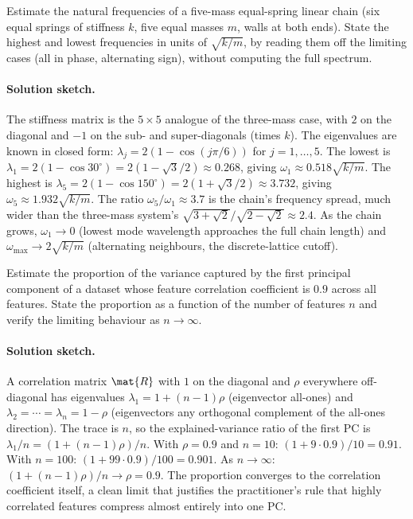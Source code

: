 \begin{exercise}
Estimate the natural frequencies of a five-mass equal-spring
linear chain (six equal springs of stiffness $k$, five equal masses
$m$, walls at both ends). State the highest and lowest frequencies
in units of $\sqrt{k/m}$, by reading them off the limiting cases
(all in phase, alternating sign), without computing the full
spectrum.
\end{exercise}

\paragraph{Solution sketch.}
The stiffness matrix is the $5 \times 5$ analogue of the three-mass
case, with $2$ on the diagonal and $-1$ on the sub- and
super-diagonals (times $k$). The eigenvalues are known in closed
form: $\lambda_{j} = 2(1 - \cos(j\pi/6))$ for $j = 1, \ldots, 5$.
The lowest is $\lambda_{1} = 2(1 - \cos 30^{\circ}) = 2(1 -
\sqrt{3}/2) \approx 0.268$, giving $\omega_{1} \approx 0.518
\sqrt{k/m}$. The highest is $\lambda_{5} = 2(1 - \cos 150^{\circ}) =
2(1 + \sqrt{3}/2) \approx 3.732$, giving $\omega_{5} \approx 1.932
\sqrt{k/m}$. The ratio $\omega_{5}/\omega_{1} \approx 3.7$ is the
chain's frequency spread, much wider than the three-mass system's
$\sqrt{3+\sqrt{2}}/\sqrt{2-\sqrt{2}} \approx 2.4$. As the chain
grows, $\omega_{1} \to 0$ (lowest mode wavelength approaches the
full chain length) and $\omega_{\max} \to 2\sqrt{k/m}$ (alternating
neighbours, the discrete-lattice cutoff).

\begin{exercise}
Estimate the proportion of the variance captured by the first
principal component of a dataset whose feature correlation
coefficient is $0.9$ across all features. State the proportion as
a function of the number of features $n$ and verify the limiting
behaviour as $n \to \infty$.
\end{exercise}

\paragraph{Solution sketch.}
A correlation matrix $\mat{R}$ with $1$ on the diagonal and $\rho$
everywhere off-diagonal has eigenvalues $\lambda_{1} = 1 + (n-1)\rho$
(eigenvector all-ones) and $\lambda_{2} = \cdots = \lambda_{n} =
1 - \rho$ (eigenvectors any orthogonal complement of the all-ones
direction). The trace is $n$, so the explained-variance ratio of
the first PC is $\lambda_{1}/n = (1 + (n-1)\rho)/n$. With $\rho =
0.9$ and $n = 10$: $(1 + 9 \cdot 0.9)/10 = 0.91$. With $n = 100$:
$(1 + 99 \cdot 0.9)/100 = 0.901$. As $n \to \infty$: $(1 + (n-1)
\rho)/n \to \rho = 0.9$. The proportion converges to the
correlation coefficient itself, a clean limit that justifies the
practitioner's rule that highly correlated features compress almost
entirely into one PC.

